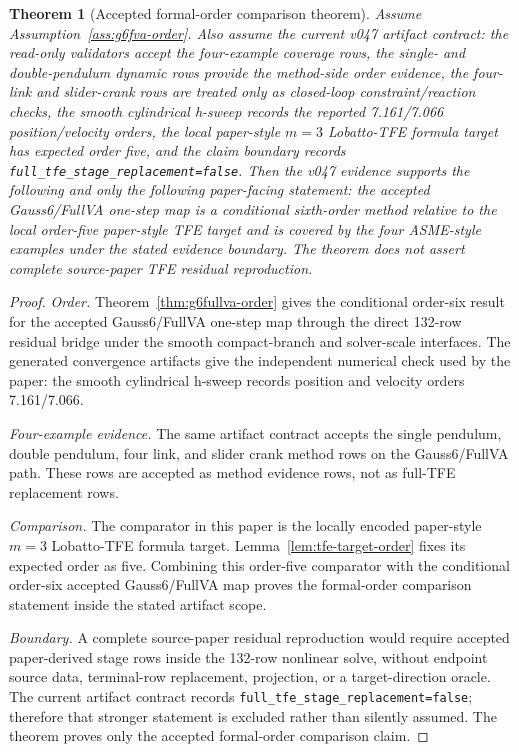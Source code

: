 \documentclass[11pt]{article}
\newtheorem{theorem}{Theorem}
\newcommand{\method}{Gauss6/FullVA}
\newcommand{\tfe}{TFE}
\begin{document}
\begin{theorem}[Accepted formal-order comparison theorem]
\label{thm:accepted-formal-order-comparison}
Assume Assumption~\ref{ass:g6fva-order}.  Also assume the current v047 artifact contract:
the read-only validators accept the four-example coverage rows, the single-
and double-pendulum dynamic rows provide the method-side order evidence, the
four-link and slider-crank rows are treated only as closed-loop
constraint/reaction checks, the smooth cylindrical h-sweep records the reported
7.161/7.066 position/velocity orders, the local paper-style $m=3$
Lobatto-\tfe{} formula target has expected order five, and the claim boundary records
\nolinkurl{full_tfe_stage_replacement=false}.  Then the v047 evidence supports
the following and only the following paper-facing statement: the accepted
\method{} one-step map is a conditional sixth-order method relative to the
local order-five paper-style \tfe{} target and is covered by the four
ASME-style examples under the stated evidence boundary.  The theorem does not assert complete source-paper
\tfe{} residual reproduction.
\end{theorem}

\begin{proof}
\emph{Order.}  Theorem~\ref{thm:g6fullva-order} gives the conditional
order-six result for the accepted \method{} one-step map through the direct
132-row residual bridge under the smooth compact-branch and solver-scale
interfaces.  The generated convergence artifacts give the independent
numerical check used by the paper: the smooth cylindrical h-sweep records
position and velocity orders 7.161/7.066.

\emph{Four-example evidence.}  The same artifact contract accepts the
single pendulum, double pendulum, four link, and slider crank method rows on
the \method{} path.  These rows are accepted as method evidence rows, not as
full-\tfe{} replacement rows.

\emph{Comparison.}  The comparator in this paper is the locally encoded
paper-style $m=3$ Lobatto-\tfe{} formula target.  Lemma~\ref{lem:tfe-target-order}
fixes its expected order as five. Combining this order-five comparator with
the conditional order-six accepted \method{} map proves the formal-order
comparison statement inside the stated
artifact scope.

\emph{Boundary.}  A complete source-paper residual reproduction would require
accepted paper-derived stage rows inside the 132-row nonlinear solve, without
endpoint source data, terminal-row replacement, projection, or a
target-direction oracle.  The current artifact contract records
\nolinkurl{full_tfe_stage_replacement=false}; therefore that stronger
statement is excluded rather than silently assumed.  The theorem proves only
the accepted formal-order comparison claim.
\end{proof}
\end{document}
